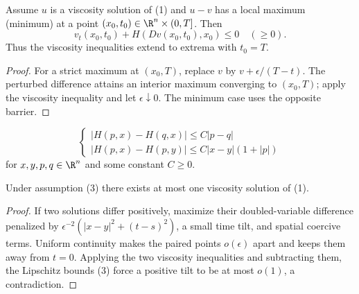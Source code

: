 \begin{lemma}
\label{lem:extrema-at-terminal-time}
Assume $u$ is a viscosity solution of (1) and $u - v$ has a local maximum (minimum) at a point $(x_0, t_0) \in \R^n \times (0, T]$. Then
\[
v_t(x_0, t_0) + H(Dv(x_0, t_0), x_0) \le 0 \quad (\ge 0).
\tag{2}
\]
Thus the viscosity inequalities extend to extrema with $t_0=T$.
\end{lemma}

\begin{proof}
\sketch For a strict maximum at $(x_0,T)$, replace $v$ by $v+\epsilon/(T-t)$. The perturbed difference attains an interior maximum converging to $(x_0,T)$; apply the viscosity inequality and let $\epsilon\downarrow0$. The minimum case uses the opposite barrier.
\end{proof}

\begin{definition}
\label{def:hamiltonian-lipschitz-condition}
\[
\begin{cases}
|H(p,x) - H(q,x)| \leq C|p - q| \\
|H(p,x) - H(p,y)| \leq C|x - y|(1 + |p|)
\end{cases}
\tag{3}
\]
for $x, y, p, q \in \R^n$ and some constant $C \geq 0$.
\end{definition}

\begin{theorem}
\label{thm:uniqueness-viscosity-solution-hj}
Under assumption (3) there exists at most one viscosity solution of (1).
\end{theorem}

\begin{proof}
\sketch If two solutions differ positively, maximize their doubled-variable difference penalized by $\epsilon^{-2}(|x-y|^2+(t-s)^2)$, a small time tilt, and spatial coercive terms. Uniform continuity makes the paired points $o(\epsilon)$ apart and keeps them away from $t=0$. Applying the two viscosity inequalities and subtracting them, the Lipschitz bounds (3) force a positive tilt to be at most $o(1)$, a contradiction.
\end{proof}

